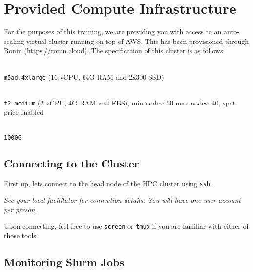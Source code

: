 \section{Provided Compute Infrastructure}

For the purposes of this training, we are providing you with access to an auto-scaling virtual cluster running on top of AWS.
This has been provisioned through Ronin (\url{https://ronin.cloud}).
The specification of this cluster is as follows:

\begin{description}[style=multiline,labelindent=0cm,align=left,leftmargin=0.5cm]
  \item[Head Node]\hfill\\
    \texttt{m5ad.4xlarge} (16 vCPU, 64G RAM and 2x300 SSD)
  \item[Compute Nodes]\hfill\\
	  \texttt{t2.medium} (2 vCPU, 4G RAM and EBS), min nodes: 20 max nodes: 40, spot price enabled
  \item[Shared Storage]\hfill\\
    \texttt{1000G}
\end{description}

\subsection{Connecting to the Cluster}

\begin{steps}
First up, lets connect to the head node of the HPC cluster using \texttt{ssh}.

\emph{See your local facilitator for connection details. You will have one user account per person.}

Upon connecting, feel free to use \texttt{screen} or \texttt{tmux} if you are familiar with either of those tools.

\end{steps}

\subsection{Monitoring Slurm Jobs}

